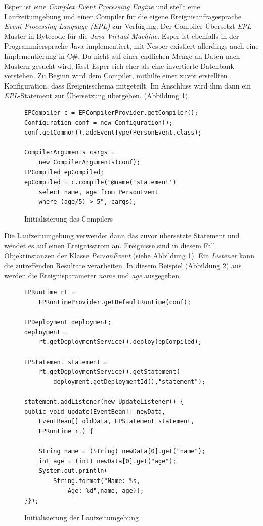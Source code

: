 \documentclass{acm_proc_article-sp}
\begin{document}
Esper ist eine \textit{Complex Event Processing Engine} und stellt eine Laufzeitumgebung 
und einen Compiler für die eigene Ereignisanfragesprache \textit{Event Processing 
Language (EPL)} zur Verfügung. Der Compiler Übersetzt \textit{EPL}-Muster in Bytecode für 
die 
\textit{Java Virtual Machine}. Esper ist ebenfalls in der Programmiersprache Java 
implementiert, mit Nesper existiert allerdings auch eine Implementierung in C\#. Da nicht 
auf einer endlichen Menge an Daten nach Mustern gesucht wird, lässt Esper sich eher als 
eine invertierte Datenbank verstehen. Zu Beginn wird dem Compiler, mithilfe einer 
zuvor erstellten Konfiguration, dass Ereignisschema mitgeteilt. Im Anschluss wird ihm 
dann ein \textit{EPL}-Statement zur Übersetzung übergeben. (Abbildung 
\ref{java:01}). 

\begin{figure}[H]    
\begin{verbatim}
EPCompiler c = EPCompilerProvider.getCompiler();
Configuration conf = new Configuration();
conf.getCommon().addEventType(PersonEvent.class);

CompilerArguments cargs = 
    new CompilerArguments(conf);
EPCompiled epCompiled;
epCompiled = c.compile("@name('statement')
    select name, age from PersonEvent
    where (age/5) > 5", cargs);
\end{verbatim}
\caption{Initialisierung des Compilers}
\label{java:01}
\end{figure}

Die Laufzeitumgebung verwendet dann das zuvor übersetzte Statement und wendet es auf 
einen Ereignisstrom an. Ereignisse sind in diesem Fall Objektinstanzen der Klasse 
\emph{PersonEvent} (siehe Abbildung \ref{java:01}). Ein \textit{Listener} kann die 
zutreffenden Resultate verarbeiten. In 
diesem Beispiel (Abbildung \ref{java:02}) aus \cite{esper-reference} werden die 
Ereignisparameter \textit{name} und \textit{age} ausgegeben.

\begin{figure}[H]    
\begin{verbatim}
EPRuntime rt =
    EPRuntimeProvider.getDefaultRuntime(conf);
    
EPDeployment deployment;
deployment =
    rt.getDeploymentService().deploy(epCompiled);
    
EPStatement statement =         
    rt.getDeploymentService().getStatement(
        deployment.getDeploymentId(),"statement");
        
statement.addListener(new UpdateListener() {
public void update(EventBean[] newData,
    EventBean[] oldData, EPStatement statement,
    EPRuntime rt) {
    
    String name = (String) newData[0].get("name");
    int age = (int) newData[0].get("age");
    System.out.println(
        String.format("Name: %s,
            Age: %d",name, age));
}});
\end{verbatim}
    \caption{Initialisierung der Laufzeitumgebung}
    \label{java:02}
\end{figure}
\end{document}
